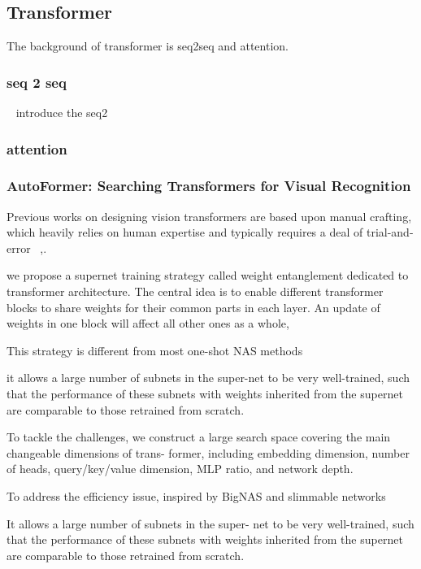 \documentclass[UTF8]{article}
\begin{document}
\subsection{Transformer}

The background of transformer is seq2seq and attention.
\subsubsection{seq 2 seq}
~\cite{sutskever2014sequence} introduce the seq2
\subsubsection{attention}

\subsubsection{AutoFormer: Searching Transformers for Visual Recognition}
Previous works on designing vision transformers are based upon manual crafting, which heavily relies on human expertise and typically requires a deal of trial-and- error ~\cite{yuan2021tokens, touvron2021training, dosovitskiy2020image},.

we propose a supernet training strategy called weight entanglement dedicated to transformer architecture. The central idea is to enable different transformer blocks to share weights for their common parts in each layer. An update of weights in one block will affect all other ones as a whole,

This strategy is different from most one-shot NAS methods \cite{guo2020single, chu2021fairnas, wu2019fbnet}

it allows a large number of subnets in the super-net to be very well-trained, such that the performance of these subnets with weights inherited from the supernet are comparable to those retrained from scratch.

To tackle the challenges, we construct a large search space covering the main changeable dimensions of trans- former, including embedding dimension, number of heads, query/key/value dimension, MLP ratio, and network depth.

To address the efficiency issue, inspired by BigNAS \cite{yu2020bignas} and slimmable networks \cite{yu2020bignas, yu2018slimmable}

It allows a large number of subnets in the super- net to be very well-trained, such that the performance of these subnets with weights inherited from the supernet are comparable to those retrained from scratch.
\end{document}
